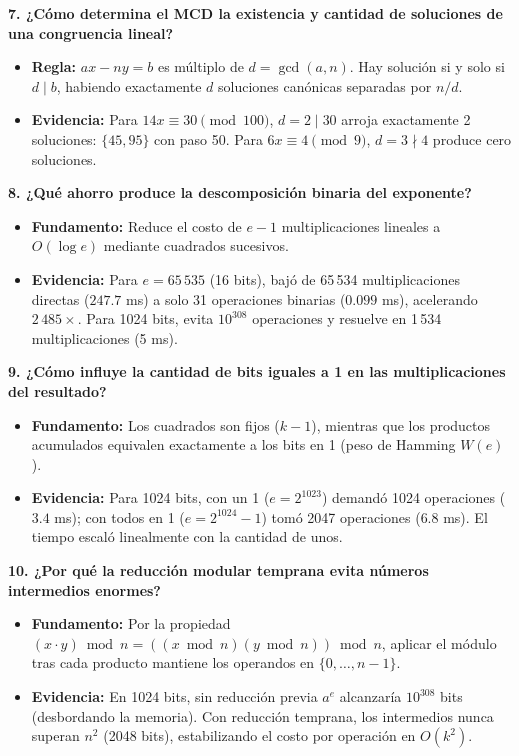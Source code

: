 \smallskip
\noindent\textbf{7. ¿Cómo determina el MCD la existencia y cantidad de soluciones de una congruencia lineal?}
\begin{itemize}\setlength\itemsep{0pt}\setlength\parskip{0pt}
    \item \textbf{Regla:} $ax - ny = b$ es múltiplo de $d = \gcd(a, n)$. Hay solución si y solo si $d \mid b$, habiendo exactamente $d$ soluciones canónicas separadas por $n/d$.
    \item \textbf{Evidencia:} Para $14x \equiv 30 \pmod{100}$, $d = 2 \mid 30$ arroja exactamente 2 soluciones: $\{45, 95\}$ con paso 50. Para $6x \equiv 4 \pmod 9$, $d = 3 \nmid 4$ produce cero soluciones.
\end{itemize}

\smallskip
\noindent\textbf{8. ¿Qué ahorro produce la descomposición binaria del exponente?}
\begin{itemize}\setlength\itemsep{0pt}\setlength\parskip{0pt}
    \item \textbf{Fundamento:} Reduce el costo de $e - 1$ multiplicaciones lineales a $O(\log e)$ mediante cuadrados sucesivos.
    \item \textbf{Evidencia:} Para $e = 65\,535$ (16 bits), bajó de 65\,534 multiplicaciones directas ($247.7$ ms) a solo 31 operaciones binarias ($0.099$ ms), acelerando $2\,485\times$. Para 1024 bits, evita $10^{308}$ operaciones y resuelve en 1\,534 multiplicaciones (5 ms).
\end{itemize}

\smallskip
\noindent\textbf{9. ¿Cómo influye la cantidad de bits iguales a 1 en las multiplicaciones del resultado?}
\begin{itemize}\setlength\itemsep{0pt}\setlength\parskip{0pt}
    \item \textbf{Fundamento:} Los cuadrados son fijos ($k - 1$), mientras que los productos acumulados equivalen exactamente a los bits en 1 (peso de Hamming $W(e)$).
    \item \textbf{Evidencia:} Para 1024 bits, con un 1 ($e = 2^{1023}$) demandó 1024 operaciones ($3.4$ ms); con todos en 1 ($e = 2^{1024}-1$) tomó 2047 operaciones ($6.8$ ms). El tiempo escaló linealmente con la cantidad de unos.
\end{itemize}

\smallskip
\noindent\textbf{10. ¿Por qué la reducción modular temprana evita números intermedios enormes?}
\begin{itemize}\setlength\itemsep{0pt}\setlength\parskip{0pt}
    \item \textbf{Fundamento:} Por la propiedad $(x \cdot y) \bmod n = ((x \bmod n)(y \bmod n)) \bmod n$, aplicar el módulo tras cada producto mantiene los operandos en $\{0, \dots, n-1\}$.
    \item \textbf{Evidencia:} En 1024 bits, sin reducción previa $a^e$ alcanzaría $10^{308}$ bits (desbordando la memoria). Con reducción temprana, los intermedios nunca superan $n^2$ (2048 bits), estabilizando el costo por operación en $O(k^2)$.
\end{itemize}

